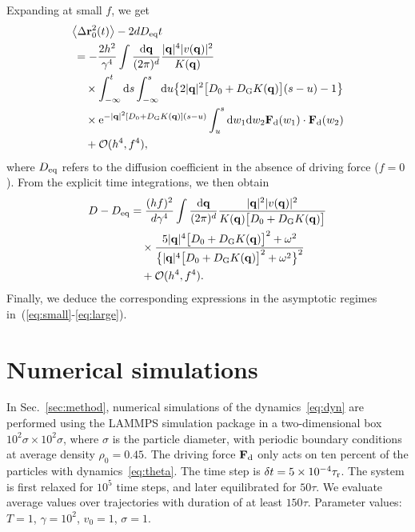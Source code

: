 \documentclass[pre, superscriptaddress, twocolumn,pre]{revtex4-1}
\begin{document}
Expanding at small $f$, we get
\begin{equation}
	\begin{aligned}
		&\big\langle\Delta{\bf r}^2_0(t)\big\rangle - 2 d D_{\rm eq} t
		\\
		&\,= - \frac{2h^2}{\gamma^4} \int \frac{{\rm d}{\bf q}}{(2\pi)^d} \frac{|{\bf q}|^4 |v({\bf q})|^2}{K({\bf q})}
		\\
		&\,\quad\times \int_{-\infty}^t{\rm d}s \int_{-\infty}^s{\rm d}u \big\{ 2|{\bf q}|^2\big[D_0+D_{\rm G}K({\bf q})\big](s-u) - 1\big\}
		\\
		&\,\quad\times {\rm e}^{ -|{\bf q}|^2[D_0+D_{\rm G}K({\bf q})](s-u)} \int_u^s {\rm d}w_1{\rm d}w_2 {\bf F}_{\rm d}(w_1)\cdot{\bf F}_{\rm d}(w_2)
		\\
		&\,\quad + {\cal O}(h^4,f^4) ,
	\end{aligned}
\end{equation}
where $D_{\rm eq}$ refers to the diffusion coefficient in the absence of driving force ($f=0$). From the explicit time integrations, we then obtain
\begin{equation}
	\begin{aligned}
		D - D_{\rm eq} &= \frac{(hf)^2}{d\gamma^4} \int \frac{{\rm d}{\bf q}}{(2\pi)^d} \frac{|{\bf q}|^2|v({\bf q})|^2}{K({\bf q})\big[D_0+D_{\rm G}K({\bf q})\big]}
		\\
		&\quad\times \frac{5|{\bf q}|^4\big[D_0+D_{\rm G}K({\bf q})\big]^2 + \omega^2}{ \big\{ |{\bf q}|^4\big[D_0+D_{\rm G}K({\bf q})\big]^2 + \omega^2 \big\}^2}
		\\
		&\quad + {\cal O}(h^4,f^4)  .
	\end{aligned}
\end{equation}
Finally, we deduce the corresponding expressions in the asymptotic regimes in~(\ref{eq:small}-\ref{eq:large}).




\section{Numerical simulations}\label{app:simu}

In Sec.~\ref{sec:method}, numerical simulations of the dynamics~\eqref{eq:dyn} are performed using the LAMMPS simulation package in a two-dimensional box $10^2\sigma\times 10^2\sigma$, where $\sigma$ is the particle diameter, with periodic boundary conditions at average density $\rho_0=0.45$. The driving force ${\bf F}_{\rm d}$ only acts on ten percent of the particles with dynamics~\eqref{eq:theta}. The time step is $\delta t = 5\times 10^{-4} \tau_{\rm r}$. The system is first relaxed for $10^5$ time steps, and later equilibrated for $50\tau$. We evaluate average values over trajectories with duration of at least $150\tau$. Parameter values: $T=1$, $\gamma=10^2$, $v_0=1$, $\sigma=1$.
\end{document}
